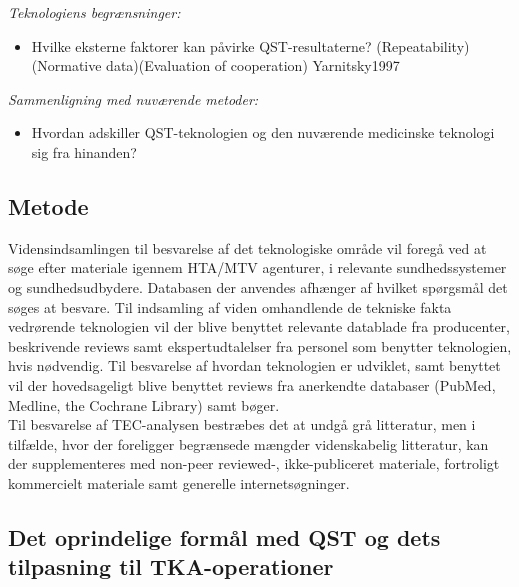 \textit{Teknologiens begrænsninger:}
\begin{itemize}
\item Hvilke eksterne faktorer kan påvirke QST-resultaterne? (Repeatability)(Normative data)(Evaluation of cooperation) Yarnitsky1997
\end{itemize}

\textit{Sammenligning med nuværende metoder:}
\begin{itemize}
\item Hvordan adskiller QST-teknologien og den nuværende medicinske teknologi sig fra hinanden? %
\end{itemize}

\subsection{Metode \citep{HTAcore}}
Vidensindsamlingen til besvarelse af det teknologiske område vil foregå ved at søge efter materiale igennem HTA/MTV agenturer, i relevante sundhedssystemer og sundhedsudbydere. Databasen der anvendes afhænger af hvilket spørgsmål det søges at besvare. Til indsamling af viden omhandlende de tekniske fakta vedrørende teknologien vil der blive benyttet relevante datablade fra producenter, beskrivende reviews samt ekspertudtalelser fra personel som benytter teknologien, hvis nødvendig. Til besvarelse af hvordan teknologien er udviklet, samt benyttet vil der hovedsageligt blive benyttet reviews fra anerkendte databaser (PubMed, Medline, the Cochrane Library) samt bøger.  \\
Til besvarelse af TEC-analysen bestræbes det at undgå grå litteratur, men i tilfælde, hvor der foreligger begrænsede mængder videnskabelig litteratur, kan der supplementeres med non-peer reviewed-, ikke-publiceret materiale, fortroligt kommercielt materiale samt generelle internetsøgninger.

\subsection{Det oprindelige formål med QST og dets tilpasning til TKA-operationer}


\subsection{}